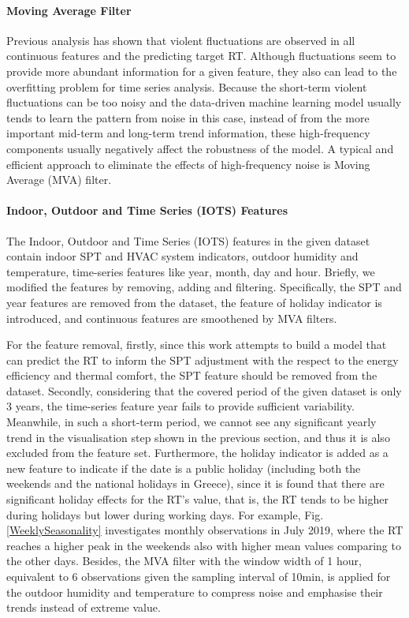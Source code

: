 \documentclass[11pt]{article}
\begin{document}
    \paragraph{Moving Average Filter}
    Previous analysis has shown that violent fluctuations are observed in all continuous features and the predicting target RT. Although fluctuations seem to provide more abundant information for a given feature, they also can lead to the overfitting problem for time series analysis. Because the short-term violent fluctuations can be too noisy and the data-driven machine learning model usually tends to learn the pattern from noise in this case, instead of from the more important mid-term and long-term trend information, these high-frequency components usually negatively affect the robustness of the model. A typical and efficient approach to eliminate the effects of high-frequency noise is Moving Average (MVA) filter\citep{box2015time}.
    
    \paragraph{Indoor, Outdoor and Time Series (IOTS) Features}
    The Indoor, Outdoor and Time Series (IOTS) features in the given dataset contain indoor SPT and HVAC system indicators, outdoor humidity and temperature, time-series features like year, month, day and hour. Briefly, we modified the features by removing, adding and filtering. Specifically, the SPT and year features are removed from the dataset, the feature of holiday indicator is introduced, and continuous features are smoothened by MVA filters.
    
    For the feature removal, firstly, since this work attempts to build a model that can predict the RT to inform the SPT adjustment with the respect to the energy efficiency and thermal comfort, the SPT feature should be removed from the dataset. Secondly, considering that the covered period of the given dataset is only 3 years, the time-series feature year fails to provide sufficient variability. Meanwhile, in such a short-term period, we cannot see any significant yearly trend in the visualisation step shown in the previous section, and thus it is also excluded from the feature set. Furthermore, the holiday indicator is added as a new feature to indicate if the date is a public holiday (including both the weekends and the national holidays in Greece), since it is found that there are significant holiday effects for the RT’s value, that is, the RT tends to be higher during holidays but lower during working days. For example, Fig.\ref{WeeklySeasonality} investigates monthly observations in July 2019, where the RT reaches a higher peak in the weekends also with higher mean values comparing to the other days. Besides, the MVA filter with the window width of 1 hour, equivalent to 6 observations given the sampling interval of 10min, is applied for the outdoor humidity and temperature to compress noise and emphasise their trends instead of extreme value.
    
\end{document}
